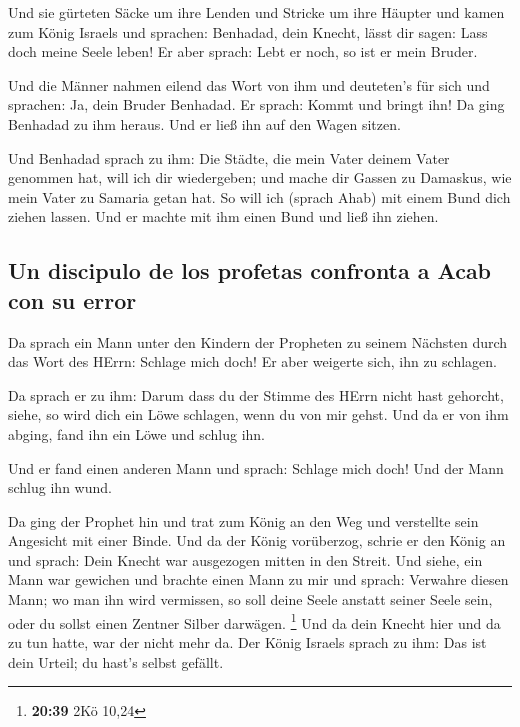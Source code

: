  Und sie gürteten Säcke um ihre Lenden und Stricke um
ihre Häupter und kamen zum König Israels und sprachen: Benhadad, dein
Knecht, lässt dir sagen: Lass doch meine Seele leben! Er aber sprach:
Lebt er noch, so ist er mein Bruder.

 Und die Männer nahmen eilend das Wort von ihm und
deuteten's für sich und sprachen: Ja, dein Bruder Benhadad. Er sprach:
Kommt und bringt ihn! Da ging Benhadad zu ihm heraus. Und er ließ ihn
auf den Wagen sitzen.

 Und Benhadad sprach zu ihm: Die Städte, die mein Vater
deinem Vater genommen hat, will ich dir wiedergeben; und mache dir
Gassen zu Damaskus, wie mein Vater zu Samaria getan hat. So will ich
(sprach Ahab) mit einem Bund dich ziehen lassen. Und er machte mit ihm
einen Bund und ließ ihn ziehen.

\hypertarget{un-discipulo-de-los-profetas-confronta-a-acab-con-su-error}{%
\subsection{Un discipulo de los profetas confronta a Acab con su
error}\label{un-discipulo-de-los-profetas-confronta-a-acab-con-su-error}}

 Da sprach ein Mann unter den Kindern der Propheten zu
seinem Nächsten durch das Wort des HErrn: Schlage mich doch! Er aber
weigerte sich, ihn zu schlagen.

 Da sprach er zu ihm: Darum dass du der Stimme des HErrn
nicht hast gehorcht, siehe, so wird dich ein Löwe schlagen, wenn du von
mir gehst. Und da er von ihm abging, fand ihn ein Löwe und schlug ihn.

 Und er fand einen anderen Mann und sprach: Schlage mich
doch! Und der Mann schlug ihn wund.

 Da ging der Prophet hin und trat zum König an den Weg
und verstellte sein Angesicht mit einer Binde.  Und da
der König vorüberzog, schrie er den König an und sprach: Dein Knecht war
ausgezogen mitten in den Streit. Und siehe, ein Mann war gewichen und
brachte einen Mann zu mir und sprach: Verwahre diesen Mann; wo man ihn
wird vermissen, so soll deine Seele anstatt seiner Seele sein, oder du
sollst einen Zentner Silber darwägen. \footnote{\textbf{20:39} 2Kö 10,24}
 Und da dein Knecht hier und da zu tun hatte, war der
nicht mehr da. Der König Israels sprach zu ihm: Das ist dein Urteil; du
hast's selbst gefällt.

